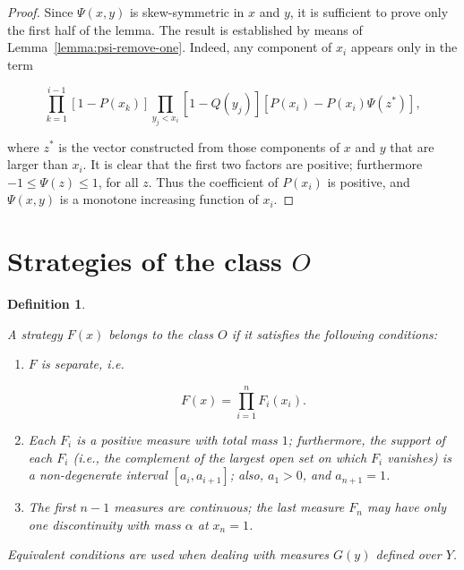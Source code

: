 \documentclass{article}
\newtheorem{definition}{Definition}
\theoremstyle{remark}
\begin{document}
\begin{proof}

Since $\Psi(x, y)$ is skew-symmetric in $x$ and $y$, it is sufficient to prove
only the first half of the lemma. The result is established by means of
Lemma~\ref{lemma:psi-remove-one}. Indeed, any component of $x_i$ appears only
in the term

\[
    \prod_{k=1}^{i-1} [1 - P(x_k)] \prod_{y_j < x_i} [1 - Q(y_j)] [P(x_i) -
P(x_i) \Psi(z^*)],
\]

where $z^*$ is the vector constructed from those components of $x$ and $y$ that
are larger than $x_i$. It is clear that the first two factors are positive;
furthermore $-1 \leq \Psi(z) \leq 1$, for all $z$. Thus the coefficient of
$P(x_i)$ is positive, and $\Psi(x, y)$ is a monotone increasing function of
$x_i$.

\end{proof}

\section{Strategies of the class $O$}

\begin{definition} \label{defn:class-o}

A strategy $F(x)$ belongs to the class $O$ if it satisfies the following
conditions:

\begin{enumerate}

\item $F$ is separate, i.e.

\[
    F(x) = \prod_{i=1}^n F_i(x_i).
\]

\item Each $F_i$ is a positive measure with total mass $1$; furthermore, the
support of each $F_i$ (i.e., the complement of the largest open set on which
$F_i$ vanishes) is a non-degenerate interval $[a_i, a_{i+1}]$; also, $a_1 > 0$,
and $a_{n+1} = 1$.

\item The first $n-1$ measures are continuous; the last measure $F_n$ may have
only one discontinuity with mass $\alpha$ at $x_n = 1$.

\end{enumerate}

Equivalent conditions are used when dealing with measures $G(y)$ defined over
$Y$.

\end{definition}
\end{document}
